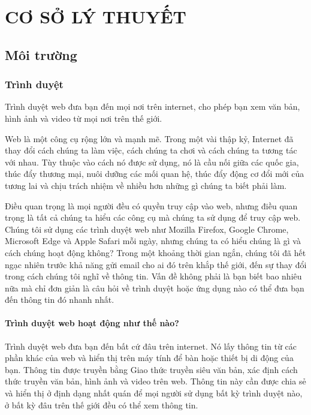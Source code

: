 \fontsize{13px}{13px}\selectfont\justifying

	\chapter{CƠ SỞ LÝ THUYẾT}

	\fontsize{13px}{13px}\selectfont\justifying
	\section{Môi trường}
	
	\subsection{Trình duyệt}\label{subsection:webclient}
	Trình duyệt \cite{browser:what} web đưa bạn đến mọi nơi trên internet, cho phép bạn xem văn bản, hình ảnh và video từ mọi nơi trên thế giới.
	
	Web là một công cụ rộng lớn và mạnh mẽ. Trong một vài thập kỷ, Internet đã thay đổi cách chúng ta làm việc, cách chúng ta chơi và cách chúng ta tương tác với nhau. Tùy thuộc vào cách nó được sử dụng, nó là cầu nối giữa các quốc gia, thúc đẩy thương mại, nuôi dưỡng các mối quan hệ, thúc đẩy động cơ đổi mới của tương lai và chịu trách nhiệm về nhiều hơn những gì chúng ta biết phải làm.
	
	Điều quan trọng là mọi người đều có quyền truy cập vào web, nhưng điều quan trọng là tất cả chúng ta hiểu các công cụ mà chúng ta sử dụng để truy cập web. Chúng tôi sử dụng các trình duyệt web như Mozilla Firefox, Google Chrome, Microsoft Edge và Apple Safari mỗi ngày, nhưng chúng ta có hiểu chúng là gì và cách chúng hoạt động không? Trong một khoảng thời gian ngắn, chúng tôi đã hết ngạc nhiên trước khả năng gửi email cho ai đó trên khắp thế giới, đến sự thay đổi trong cách chúng tôi nghĩ về thông tin. Vấn đề không phải là bạn biết bao nhiêu nữa mà chỉ đơn giản là câu hỏi về trình duyệt hoặc ứng dụng nào có thể đưa bạn đến thông tin đó nhanh nhất.
	
	
	\subsubsection{Trình duyệt web hoạt động như thế nào?}
	Trình duyệt web đưa bạn đến bất cứ đâu trên internet. Nó lấy thông tin từ các phần khác của web và hiển thị trên máy tính để bàn hoặc thiết bị di động của bạn. Thông tin được truyền bằng Giao thức truyền siêu văn bản, xác định cách thức truyền văn bản, hình ảnh và video trên web. Thông tin này cần được chia sẻ và hiển thị ở định dạng nhất quán để mọi người sử dụng bất kỳ trình duyệt nào, ở bất kỳ đâu trên thế giới đều có thể xem thông tin.
	
